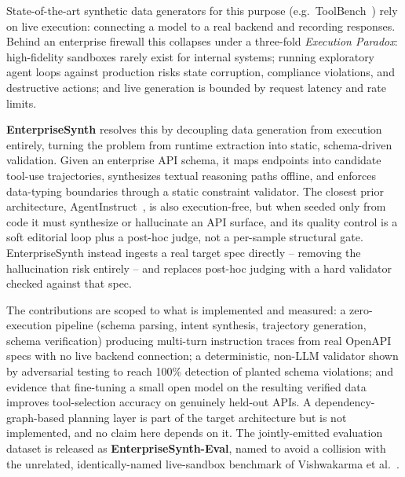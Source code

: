 \documentclass[letterpaper]{article} %
\begin{document}
State-of-the-art synthetic data generators for this purpose (e.g.\
ToolBench~\cite{qin2023toolbench}) rely on live execution: connecting a model to a real backend
and recording responses. Behind an enterprise firewall this collapses under a three-fold
\textit{Execution Paradox}: high-fidelity sandboxes rarely exist for internal systems; running
exploratory agent loops against production risks state corruption, compliance violations, and
destructive actions; and live generation is bounded by request latency and rate limits.

\textbf{EnterpriseSynth} resolves this by decoupling data generation from execution entirely,
turning the problem from runtime extraction into static, schema-driven validation. Given an
enterprise API schema, it maps endpoints into candidate tool-use trajectories, synthesizes textual
reasoning paths offline, and enforces data-typing boundaries through a static constraint
validator. The closest prior architecture, AgentInstruct~\cite{mitra2024agentinstruct}, is also
execution-free, but when seeded only from code it must synthesize or hallucinate an API surface,
and its quality control is a soft editorial loop plus a post-hoc judge, not a per-sample
structural gate. EnterpriseSynth instead ingests a real target spec directly -- removing the
hallucination risk entirely -- and replaces post-hoc judging with a hard validator checked against
that spec.

The contributions are scoped to what is implemented and measured: a zero-execution pipeline
(schema parsing, intent synthesis, trajectory generation, schema verification) producing
multi-turn instruction traces from real OpenAPI specs with no live backend connection; a
deterministic, non-LLM validator shown by adversarial testing to reach 100\% detection of planted
schema violations; and evidence that fine-tuning a small open model on the resulting verified data
improves tool-selection accuracy on genuinely held-out APIs. A dependency-graph-based planning
layer is part of the target architecture but is not implemented, and no claim here depends on it.
The jointly-emitted evaluation dataset is released as \textbf{EnterpriseSynth-Eval}, named to
avoid a collision with the unrelated, identically-named live-sandbox benchmark of Vishwakarma et
al.~\cite{vishwakarma2025enterprisebench}.
\end{document}
